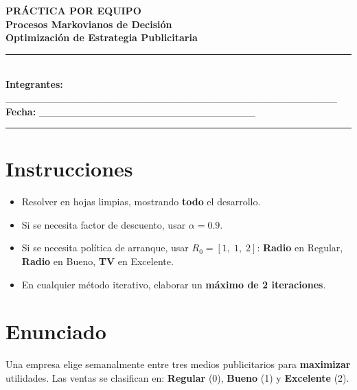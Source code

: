 \documentclass[12pt,a4paper]{article}
\begin{document}
\begin{center}
    {\LARGE \textbf{PRÁCTICA POR EQUIPO}}\\[0.3cm]
    {\Large \textbf{Procesos Markovianos de Decisión}}\\[0.2cm]
    {\large \textbf{Optimización de Estrategia Publicitaria}}\\[0.5cm]
    \rule{0.8\textwidth}{0.4pt}\\[0.3cm]
    \textbf{Integrantes:} \_\_\_\_\_\_\_\_\_\_\_\_\_\_\_\_\_\_\_\_\_\_\_\_\_\_\_\_\_\_\_\_\_\_\_\_\_\_\_\_\_\_\_\_\_\_\\[0.2cm]
    \textbf{Fecha:} \_\_\_\_\_\_\_\_\_\_\_\_\_\_\_\_\_\_\_\_\_\_\_\_\_\_\_\_\_\_\\[0.3cm]
    \rule{0.8\textwidth}{0.4pt}
\end{center}

\vspace{0.3cm}

\section*{Instrucciones}

\begin{itemize}
    \item Resolver en hojas limpias, mostrando \textbf{todo} el desarrollo.
    \item Si se necesita factor de descuento, usar $\alpha = 0.9$.
    \item Si se necesita política de arranque, usar $R_0 = [1,\; 1,\; 2]$: \textbf{Radio} en Regular, \textbf{Radio} en Bueno, \textbf{TV} en Excelente.
    \item En cualquier método iterativo, elaborar un \textbf{máximo de 2 iteraciones}.
\end{itemize}

\newpage

\section{Enunciado}

Una empresa elige semanalmente entre tres medios publicitarios para \textbf{maximizar} utilidades. Las ventas se clasifican en: \textbf{Regular} (0), \textbf{Bueno} (1) y \textbf{Excelente} (2).
\end{document}
